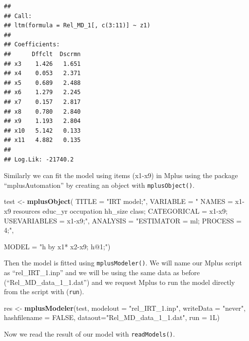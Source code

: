 \documentclass[]{book}
\newenvironment{Shaded}{\begin{snugshade}}{\end{snugshade}}
\newcommand{\DataTypeTok}[1]{\textcolor[rgb]{0.13,0.29,0.53}{#1}}
\newcommand{\KeywordTok}[1]{\textcolor[rgb]{0.13,0.29,0.53}{\textbf{#1}}}
\newcommand{\NormalTok}[1]{#1}
\newcommand{\OtherTok}[1]{\textcolor[rgb]{0.56,0.35,0.01}{#1}}
\newcommand{\StringTok}[1]{\textcolor[rgb]{0.31,0.60,0.02}{#1}}
\begin{document}
\begin{verbatim}
## 
## Call:
## ltm(formula = Rel_MD_1[, c(3:11)] ~ z1)
## 
## Coefficients:
##      Dffclt  Dscrmn
## x3    1.426   1.651
## x4    0.053   2.371
## x5    0.689   2.488
## x6    1.279   2.245
## x7    0.157   2.817
## x8    0.780   2.840
## x9    1.193   2.804
## x10   5.142   0.133
## x11   4.882   0.135
## 
## Log.Lik: -21740.2
\end{verbatim}

Similarly we can fit the model using items (x1-x9) in Mplus using the package ``mplusAutomation'' by creating an object with \texttt{mplusObject()}.

\begin{Shaded}
\begin{Highlighting}[]
\NormalTok{test <-}\StringTok{ }\KeywordTok{mplusObject}\NormalTok{(}
\DataTypeTok{TITLE =} \StringTok{"IRT model;"}\NormalTok{,}
   \DataTypeTok{VARIABLE =} \StringTok{"}
\StringTok{     NAMES = x1-x9 resources educ_yr occupation hh_size class;}
\StringTok{     CATEGORICAL = x1-x9;}
\StringTok{     USEVARIABLES = x1-x9;"}\NormalTok{,}
   \DataTypeTok{ANALYSIS =} \StringTok{"ESTIMATOR = ml;}
\StringTok{              PROCESS = 4;"}\NormalTok{,}

\DataTypeTok{MODEL =} \StringTok{"h by x1* x2-x9;}
\StringTok{         h@1;"}\NormalTok{)}
\end{Highlighting}
\end{Shaded}

Then the model is fitted using \texttt{mplusModeler()}. We will name our Mplus script as ``rel\_IRT\_1.inp'' and we will be using the same data as before (``Rel\_MD\_data\_1\_1.dat'') and we request Mplus to run the model directly from the script with (\texttt{run}).

\begin{Shaded}
\begin{Highlighting}[]
\NormalTok{res <-}\StringTok{ }\KeywordTok{mplusModeler}\NormalTok{(test, }\DataTypeTok{modelout =} \StringTok{"rel_IRT_1.inp"}\NormalTok{, }
                    \DataTypeTok{writeData =} \StringTok{"never"}\NormalTok{, }\DataTypeTok{hashfilename =} \OtherTok{FALSE}\NormalTok{, }
                    \DataTypeTok{dataout=}\StringTok{"Rel_MD_data_1_1.dat"}\NormalTok{, }\DataTypeTok{run =}\NormalTok{ 1L)}
\end{Highlighting}
\end{Shaded}

Now we read the result of our model with \texttt{readModels()}.
\end{document}
